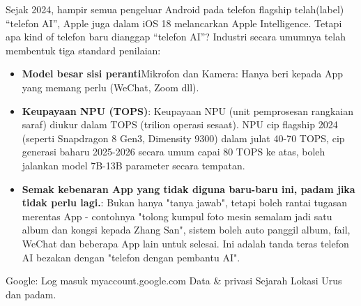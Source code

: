 


Sejak 2024, hampir semua pengeluar Android pada telefon flagship telah(label) “telefon AI”, Apple juga dalam iOS 18 melancarkan Apple Intelligence. Tetapi apa kind of telefon baru dianggap “telefon AI”? Industri secara umumnya telah membentuk tiga standard penilaian:

\begin{itemize}
  \item \textbf{Model besar sisi peranti}Mikrofon dan Kamera: Hanya beri kepada App yang memang perlu (WeChat, Zoom dll).
  \item \textbf{Keupayaan NPU (TOPS)}: Keupayaan NPU (unit pemprosesan rangkaian saraf) diukur dalam TOPS (trilion operasi sesaat). NPU cip flagship 2024 (seperti Snapdragon 8 Gen3, Dimensity 9300) dalam julat 40-70 TOPS, cip generasi baharu 2025-2026 secara umum capai 80 TOPS ke atas, boleh jalankan model 7B-13B parameter secara tempatan.
  \item \textbf{Semak kebenaran App yang tidak diguna baru-baru ini, padam jika tidak perlu lagi.}: Bukan hanya "tanya jawab", tetapi boleh rantai tugasan merentas App - contohnya "tolong kumpul foto mesin semalam jadi satu album dan kongsi kepada Zhang San", sistem boleh auto panggil album, fail, WeChat dan beberapa App lain untuk selesai. Ini adalah tanda teras telefon AI bezakan dengan "telefon dengan pembantu AI".
\end{itemize}


Google: Log masuk myaccount.google.com Data \& privasi Sejarah Lokasi Urus dan padam.

